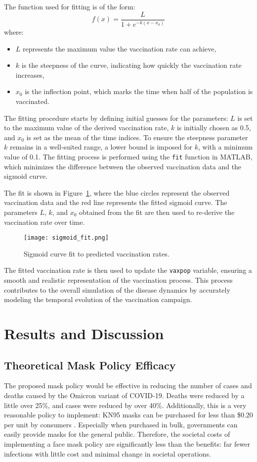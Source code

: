 \documentclass[conference]{IEEEtran}
\begin{document}
The function used for fitting is of the form:
\[
    f(x) = \frac{L}{1 + e^{-k(x - x_0)}}
\]
where:
\begin{itemize}
  \item \(L\) represents the maximum value the vaccination rate can achieve,
  \item \(k\) is the steepness of the curve, indicating how quickly the vaccination rate increases,
  \item \(x_0\) is the inflection point, which marks the time when half of the population is vaccinated.
\end{itemize}

The fitting procedure starts by defining initial guesses for the parameters: \(L\) is set to the maximum value of the derived vaccination rate, \(k\) is initially chosen as 0.5, and \(x_0\) is set as the mean of the time indices. To ensure the steepness parameter \(k\) remains in a well-suited range, a lower bound is imposed for \(k\), with a minimum value of 0.1. The fitting process is performed using the \texttt{fit} function in MATLAB, which minimizes the difference between the observed vaccination data and the sigmoid curve.

The fit is shown in Figure~\ref{fig:sigmoid_fit}, where the blue circles represent the observed vaccination data and the red line represents the fitted sigmoid curve. The parameters \(L\), \(k\), and \(x_0\) obtained from the fit are then used to re-derive the vaccination rate over time.

\begin{figure}[htbp]
\centerline{\texttt{[image: sigmoid\_fit.png]}}
\caption{Sigmoid curve fit to predicted vaccination rates.}
\label{fig:sigmoid_fit}
\end{figure}

The fitted vaccination rate is then used to update the \texttt{vaxpop} variable, ensuring a smooth and realistic representation of the vaccination process. This process contributes to the overall simulation of the disease dynamics by accurately modeling the temporal evolution of the vaccination campaign.

\section{Results and Discussion}

\subsection{Theoretical Mask Policy Efficacy}
The proposed mask policy would be effective in reducing the number of cases and deaths caused by the Omicron variant of COVID-19. Deaths were reduced by a little over 25\%, and cases were reduced by over 40\%. Additionally, this is a very reasonable policy to implement: KN95 masks can be purchased for less than \$0.20 per unit by consumers \cite{walmart}. Especially when purchased in bulk, governments can easily provide masks for the general public. Therefore, the societal costs of implementing a face mask policy are significantly less than the benefits: far fewer infections with little cost and minimal change in societal operations.
\end{document}

